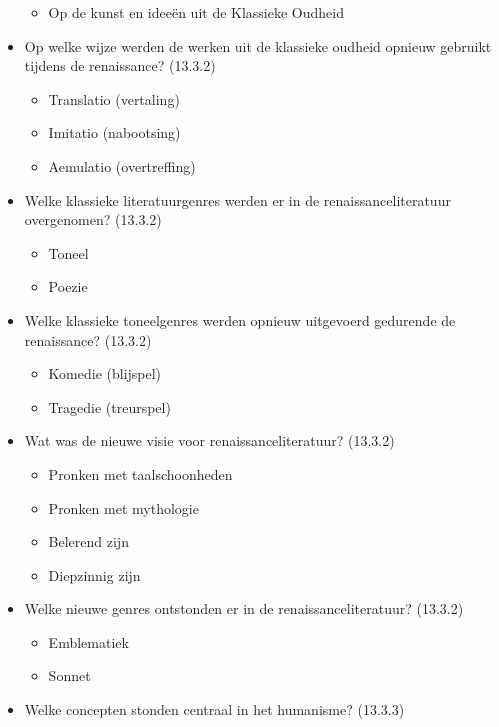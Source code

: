 \begin{itemize}
  \begin{itemize}
  \itemsep1pt\parskip0pt
  \item
    Op de kunst en ideeën uit de Klassieke Oudheid
  \end{itemize}
\item
  Op welke wijze werden de werken uit de klassieke oudheid opnieuw
  gebruikt tijdens de renaissance? (13.3.2)

  \begin{itemize}
  \itemsep1pt\parskip0pt
  \item
    Translatio (vertaling)
  \item
    Imitatio (nabootsing)
  \item
    Aemulatio (overtreffing)
  \end{itemize}
\item
  Welke klassieke literatuurgenres werden er in de renaissanceliteratuur
  overgenomen? (13.3.2)

  \begin{itemize}
  \itemsep1pt\parskip0pt
  \item
    Toneel
  \item
    Poezie
  \end{itemize}
\item
  Welke klassieke toneelgenres werden opnieuw uitgevoerd gedurende de
  renaissance? (13.3.2)

  \begin{itemize}
  \itemsep1pt\parskip0pt
  \item
    Komedie (blijspel)
  \item
    Tragedie (treurspel)
  \end{itemize}
\item
  Wat was de nieuwe visie voor renaissanceliteratuur? (13.3.2)

  \begin{itemize}
  \itemsep1pt\parskip0pt
  \item
    Pronken met taalschoonheden
  \item
    Pronken met mythologie
  \item
    Belerend zijn
  \item
    Diepzinnig zijn
  \end{itemize}
\item
  Welke nieuwe genres ontstonden er in de renaissanceliteratuur?
  (13.3.2)

  \begin{itemize}
  \itemsep1pt\parskip0pt
  \item
    Emblematiek
  \item
    Sonnet
  \end{itemize}
\item
  Welke concepten stonden centraal in het humanisme? (13.3.3)


\end{itemize}

